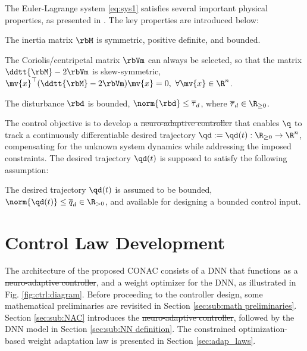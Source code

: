 \documentclass[letterpaper, journal]{IEEEtran}
\providecommand{\DIFadd}[1]{{\protect\color{blue}\uwave{#1}}} %
\providecommand{\DIFdel}[1]{{\protect\color{red}\sout{#1}}} %
\providecommand{\DIFaddbegin}{} %
\providecommand{\DIFaddend}{} %
\providecommand{\DIFdelbegin}{} %
\providecommand{\DIFdelend}{} %
\begin{document}
The Euler-Lagrange system \eqref{eq:sys1} satisfies several important physical properties, as presented in \cite[Chap. 3, Tab. 3.2.1]{Lewis:1998aa}. 
The key properties are introduced below:
\begin{prop} 
    The inertia matrix $\rbM$ is symmetric, positive definite, and bounded.
    \label{prop:M}
\end{prop}

\begin{prop} 
    The Coriolis/centripetal matrix $\rbVm$ can always be selected, so that the matrix $\ddtt{\rbM}-2\rbVm$ is skew-symmetric, \ie $\mv{x}^\top(\ddtt{\rbM}-2\rbVm)\mv{x}=0,\ \forall \mv{x}\in\R^n$.
    \label{prop:skew}
\end{prop}

\begin{prop}
    The disturbance $\rbd$ is bounded, \ie $\norm{\rbd}\le \overline\tau_d$, where $\overline\tau_d\in\R_{\ge0}$.
    \label{prop:dis_bound}
\end{prop}

The control objective is to develop a \DIFdelbegin \DIFdel{neuro-adaptive controller }\DIFdelend \DIFaddbegin \DIFadd{NAC }\DIFaddend that enables $\q$ to track a continuously differentiable desired trajectory $\qd:=\qd(t): \R_{\ge0} \to \R^n$, compensating for the unknown system dynamics while addressing the imposed constraints.
The desired trajectory $\qd(t)$ is supposed to satisfy the following assumption:
\begin{assum}
    The desired trajectory $\qd(t)$ is assumed to be bounded, \ie $\norm{\qd(t)}\le \overline{q}_d\in\R_{>0}$, and available for designing a bounded control input.
    \label{assum:feasible}
\end{assum}

\section{Control Law Development}\label{sec:ctrl design}

The architecture of the proposed CONAC consists of a DNN that functions as a \DIFdelbegin \DIFdel{neuro-adaptive controller}\DIFdelend \DIFaddbegin \DIFadd{NAC}\DIFaddend , and a weight optimizer for the DNN, as illustrated in Fig. \ref{fig:ctrl:diagram}.
Before proceeding to the controller design, some mathematical preliminaries are revisited in Section \ref{sec:sub:math preliminaries}. 
Section \ref{sec:sub:NAC} introduces the \DIFdelbegin \DIFdel{neuro-adaptive controller}\DIFdelend \DIFaddbegin \DIFadd{NAC}\DIFaddend , followed by the DNN model in Section \ref{sec:sub:NN definition}. 
The constrained optimization-based weight adaptation law is presented in Section \ref{sec:adap_laws}.
\end{document}
